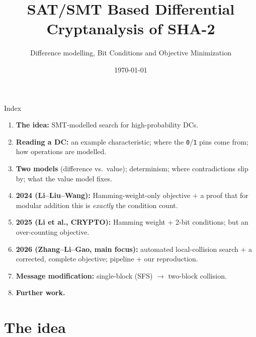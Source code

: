 \documentclass[aspectratio=169,9pt]{beamer}
\title[SAT/SMT collision attacks on SHA-2]{SAT/SMT Based Differential Cryptanalysis of SHA-2}
\subtitle{Difference modelling, Bit Conditions and Objective Minimization }
\author{}
\date{\today}
\begin{document}
\begin{frame}\titlepage\end{frame}

\begin{frame}{Index}
\begin{enumerate}\small
  \item \textbf{The idea:} SMT-modelled search for high-probability DCs.
  \item \textbf{Reading a DC:} an example characteristic; where the \texttt{0}/\texttt{1} pins come from; how operations are modelled.
  \item \textbf{Two models} (difference vs.\ value); determinism; where contradictions slip by; what the value model fixes.
  \item \textbf{2024 (Li--Liu--Wang):} Hamming-weight-only objective $+$ a proof that for modular addition this is \emph{exactly} the condition count.
  \item \textbf{2025 (Li et al., CRYPTO):} Hamming weight $+$ 2-bit conditions; but an over-counting objective.
  \item \textbf{2026 (Zhang--Li--Gao, main focus):} automated local-collision search $+$ a corrected, complete objective; pipeline $+$ our reproduction.
  \item \textbf{Message modification:} single-block (SFS) $\to$ two-block collision.
  \item \textbf{Further work.}
\end{enumerate}
\end{frame}

\section{The idea}
\end{document}
